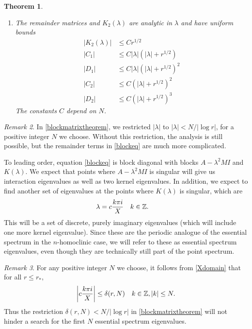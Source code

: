 \documentclass[11pt,reqno]{amsart}
\theoremstyle{plain}
\newtheorem{theorem}{Theorem}
\theoremstyle{definition}
\theoremstyle{remark}
\newtheorem{remark}[theorem]{Remark}
\begin{document}
\begin{theorem}
\begin{enumerate}
\item The remainder matrices and $K_2(\lambda)$ are analytic in $\lambda$ and have uniform bounds
\begin{align*}
|K_2(\lambda)| &\leq C r^{1/2} \\
|C_1| &\leq C |\lambda|(|\lambda| + r^{1/2}) \\
|D_1| &\leq C |\lambda|(|\lambda| + r^{1/2})^2 \\
|C_2| &\leq C (|\lambda| + r^{1/2})^2 \\
|D_2| &\leq C (|\lambda| + r^{1/2})^3 
\end{align*}
The constants $C$ depend on $N$.
\end{enumerate}
\end{theorem}

\begin{remark}
In \cref{blockmatrixtheorem}, we restricted $|\lambda|$ to $|\lambda| < N/|\log r|$, for a positive integer $N$ we choose. Without this restriction, the analysis is still possible, but the remainder terms in \cref{blockeq} are much more complicated.
\end{remark}

To leading order, equation \cref{blockeq} is block diagonal with blocks $A - \lambda^2 MI$ and $K(\lambda)$. We expect that points where $A - \lambda^2 MI$ is singular will give us interaction eigenvalues as well as two kernel eigenvalues. In addition, we expect to find another set of eigenvalues at the points where $K(\lambda)$ is singular, which are
\begin{align*}
\lambda &= c\frac{k \pi i}{X} && k \in \mathbb{Z}.
\end{align*}
This will be a set of discrete, purely imaginary eigenvalues (which will include one more kernel eigenvalue). Since these are the periodic analogue of the essential spectrum in the $n$-homoclinic case, we will refer to these as essential spectrum eigenvalues, even though they are technically still part of the point spectrum. 

\begin{remark}
For any positive integer $N$ we choose, it follows from \cref{Xdomain} that for all $r \leq r_*$,
\begin{align*}
\left| c\frac{k \pi i}{X} \right| \leq \delta(r,N) && k \in \mathbb{Z}, |k|\leq N.
\end{align*}
Thus the restriction $\delta(r,N) < N/|\log r|$ in \cref{blockmatrixtheorem} will not hinder a search for the first $N$ essential spectrum eigenvalues.
\end{remark}
\end{document}

